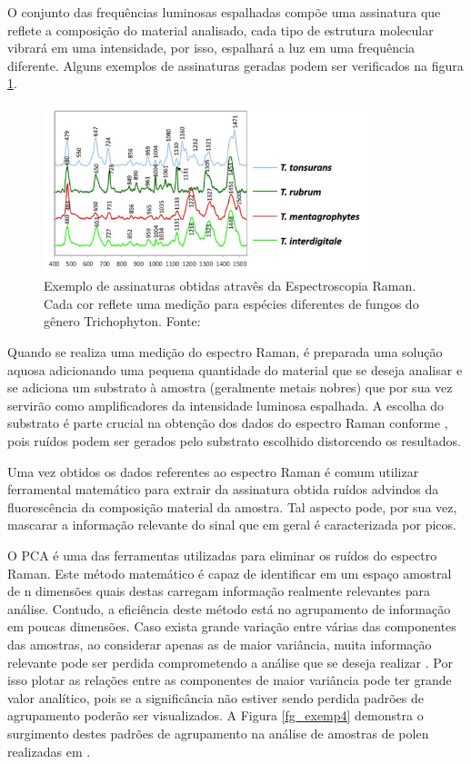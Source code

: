 \documentclass[conference,peerreview]{IEEEtran}
\begin{document}
O conjunto das frequências luminosas espalhadas compõe uma assinatura que reflete a composição do material analisado, cada tipo de estrutura molecular vibrará em uma intensidade, por isso, espalhará a luz em uma frequência diferente. Alguns exemplos de assinaturas geradas podem ser verificados na figura \ref{fg_exemp3}.

\begin{figure}[ht]
\centering
\includegraphics[width=9.5cm]{assinatura_raman_exemplo}
\caption{Exemplo de assinaturas obtidas atravês da Espectroscopia Raman. Cada cor reflete uma medição para espécies diferentes de fungos do gênero Trichophyton. Fonte: \cite{Pankin2018}}
\label{fg_exemp3}
\end{figure}

Quando se realiza uma medição do espectro Raman, é preparada uma solução aquosa adicionando uma pequena quantidade do material que se deseja analisar e se adiciona um substrato à amostra (geralmente metais nobres) que por sua vez servirão como amplificadores da intensidade luminosa espalhada. A escolha do substrato é parte crucial na obtenção dos dados do espectro Raman conforme \cite{Seifert2016}, pois ruídos podem ser gerados pelo substrato escolhido distorcendo os resultados.

Uma vez obtidos os dados referentes ao espectro Raman é comum utilizar ferramental matemático para extrair da assinatura obtida ruídos advindos da fluorescência da composição material da amostra. Tal aspecto pode, por sua vez, mascarar a informação relevante do sinal que em geral é caracterizada por picos.

O PCA é uma das ferramentas utilizadas para eliminar os ruídos do espectro Raman. Este método matemático é capaz de identificar em um espaço amostral de n dimensões quais destas carregam informação realmente relevantes para análise. Contudo, a eficiência deste método está no agrupamento de informação em poucas dimensões. Caso exista grande variação entre várias das componentes das amostras, ao considerar apenas as de maior variância, muita informação relevante pode ser perdida comprometendo a análise que se deseja realizar \cite{Brereton2017}. Por isso plotar as relações entre as componentes de maior variância pode ter grande valor analítico, pois se a significância não estiver sendo perdida padrões de agrupamento poderão ser visualizados. A Figura \ref{fg_exemp4} demonstra o surgimento destes padrões de agrupamento na análise de amostras de polen realizadas em \cite{Seifert2016}.
\end{document}
